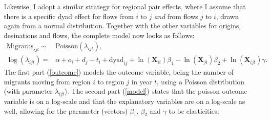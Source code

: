 \documentclass[11pt,parskip,abstracton,notitlepage, dvipsnames]{scrartcl}
\begin{document}
Likewise, I adopt a similar strategy for regional pair effects, where I assume
that there is a specific dyad effect for flows from $i$ to $j$ \emph{and} from
flows $j$ to $i$, drawn again from a normal distribution. Together with the
other variables for origins, desinations and flows, the complete model now looks
as follows:
\begin{subequations}
  \begin{align} \text{Migrants}_{ijt} \sim & \text{Poisson}(\lambda_{ijt}), \label{outcome}\\
    \log(\lambda_{ijt}) = & \alpha + o_i + d_j + t_t + \text{dyad}_{ij} + \ln(\mathbf{X}_{it})\beta_1 + \ln(\mathbf{X}_{jt})\beta_2 + \ln(\mathbf{X}_{ijt})\gamma.  \label{model}
  \end{align}
  \label{eq:prefmodel}
\end{subequations}
The first part (\ref{outcome}) models the outcome variable, being the number of
migrants moving from region $i$ to region $j$ in year $t$, using a Poisson distribution
(with parameter $\lambda_{ijt}$). The second part (\ref{model}) states that the
poisson outcome variable is on a log-scale and that the explanatory variables
are on a log-scale as well, allowing for the parameter (vectors) $\beta_1$,
$\beta_2$ and $\gamma$ to be elasticities.
    
\end{document}

